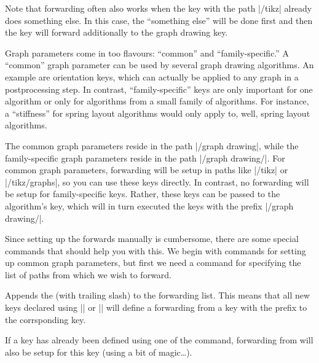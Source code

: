 Note that forwarding often also works when the key with the path
|/tikz| already does something else. In this case, the ``something
else'' will be done first and then the key will forward additionally
to the graph drawing key.

Graph parameters come in too flavours: ``common'' and
``family-specific.'' A ``common'' graph parameter can be used by
several graph drawing algorithms. An example are orientation keys,
which can actually be applied to any graph in a postprocessing
step. In contrast, ``family-specific'' keys are only important for
one algorithm or only for algorithms from a small family of
algorithms. For instance, a ``stiffness'' for spring layout algorithms 
would only apply to, well, spring layout algorithms.

The common graph parameters reside in the path |/graph drawing|,
while the family-specific graph parameters reside in the path
|/graph drawing/|. For common graph parameters,
forwarding will be setup in paths like |/tikz| or |/tikz/graphs|, so
you can use these keys directly. In contrast, no forwarding will be
setup for family-specific keys. Rather, these keys can be passed to the
algorithm's key, which will in turn executed the keys with the
prefix |/graph drawing/|.

Since setting up the forwards manually is cumbersome, there are some
special commands that should help you with this. We begin with
commands for setting up common graph parameters, but first we need a
command for specifying the list of paths from which we wish to
forward.

\begin{command}{\pgfgdappendtoforwardinglist{}}
  Appends the  (with trailing slash) to the forwarding
  list. This means that all new keys declared using
  |\pgfgddeclareforwardedkeys| or |\pgfgddeclarealgorithmkey| will
  define a forwarding from a key with the prefix  to the
  corrsponding key. 

  If a key has already been defined using one of the command,
  forwarding from  will also 
  be setup for this key (using a bit of magic\ldots).  
\end{command}


